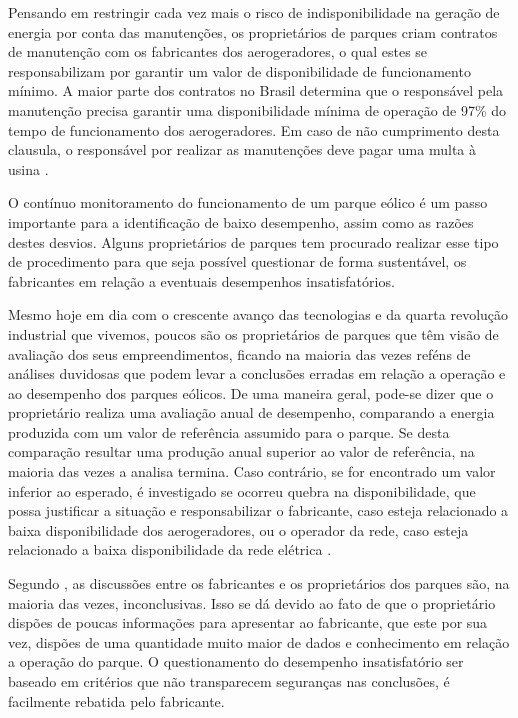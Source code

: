 Pensando em restringir cada vez mais o risco de indisponibilidade na geração de energia por conta das manutenções, os proprietários de parques criam contratos de manutenção com os fabricantes dos aerogeradores, o qual estes se responsabilizam por garantir um valor de disponibilidade de funcionamento mínimo. A maior parte dos contratos no Brasil determina que o responsável pela manutenção precisa garantir uma disponibilidade mínima de operação de 97\% do tempo de funcionamento dos aerogeradores. Em caso de não cumprimento desta clausula, o responsável por realizar as manutenções deve pagar uma multa à usina \cite{confiabilidade-aplicada-manutencao-preventiva}.

O contínuo monitoramento do funcionamento de um parque eólico é um passo importante para a identificação de baixo desempenho, assim como as razões destes desvios. Alguns proprietários de parques tem procurado realizar esse tipo de procedimento para que seja possível questionar de forma sustentável, os fabricantes em relação a eventuais desempenhos insatisfatórios.

Mesmo hoje em dia com o crescente avanço das tecnologias e da quarta revolução industrial que vivemos, poucos são os proprietários de parques que têm visão de avaliação dos seus empreendimentos, ficando na maioria das vezes reféns de análises duvidosas que podem levar a conclusões erradas em relação a operação e ao desempenho dos parques eólicos. De uma maneira geral, pode-se dizer que o proprietário realiza uma avaliação anual de desempenho, comparando a energia produzida com um valor de referência assumido para o parque. Se desta comparação resultar uma produção anual superior ao valor de referência, na maioria das vezes a analisa termina. Caso contrário, se for encontrado um valor inferior ao esperado, é investigado se ocorreu quebra na disponibilidade, que possa justificar a situação e responsabilizar o fabricante, caso esteja relacionado a baixa disponibilidade dos aerogeradores, ou o operador da rede, caso esteja relacionado a baixa disponibilidade da rede elétrica \cite{metodologia-avaliacao-desempenho-de-parques}.

Segundo , as discussões entre os fabricantes e os proprietários dos parques são, na maioria das vezes, inconclusivas. Isso se dá devido ao fato de que o proprietário dispões de poucas informações para apresentar ao fabricante, que este por sua vez, dispões de uma quantidade muito maior de dados e conhecimento em relação a operação do parque. O questionamento do desempenho insatisfatório ser baseado em critérios que não transparecem seguranças nas conclusões, é facilmente rebatida pelo fabricante.



